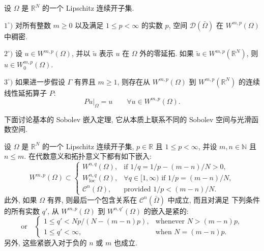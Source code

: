 
\setcounter{statement}{1}
\renewcommand{\theHstatement}{theorem.\thesection.\arabic{statement}}
\begin{Theorem}\label{thm:sobolev-density-extension}
设 $\Omega$ 是 $\mathbb R^N$ 的一个 Lipschitz 连续开子集.

$1^\circ)$ 对所有整数 $m\geq0$ 以及满足 $1\leq p<\infty$ 的实数 $p$, 空间
$\mathcal D(\bar\Omega)$ 在 $W^{m,p}(\Omega)$ 中稠密.

$2^\circ)$ 设 $u\in W^{m,p}(\Omega)$, 并以 $\tilde u$ 表示 $u$ 在 $\Omega$ 外的零延拓.
如果 $\tilde u\in W^{m,p}(\mathbb R^N)$, 则 $u\in W_0^{m,p}(\Omega)$.

$3^\circ)$ 如果进一步假设 $\Gamma$ 有界且 $m\geq1$, 则存在从 $W^{m,p}(\Omega)$ 到
$W^{m,p}(\mathbb R^N)$ 的连续线性延拓算子 $P$:
\[
  Pu|_\Omega=u\qquad\forall u\in W^{m,p}(\Omega).
\]
\end{Theorem}

下面讨论基本的 Sobolev 嵌入定理, 它从本质上联系不同的 Sobolev 空间与光滑函数空间.

\setcounter{statement}{2}
\renewcommand{\theHstatement}{theorem.\thesection.\arabic{statement}}
\begin{Theorem}\label{thm:sobolev-embedding}
设 $\Omega$ 是 $\mathbb R^N$ 的一个 Lipschitz 连续开子集, $p\in\mathbb R$ 且
$1\leq p<\infty$, 并设 $m,n\in\mathbb N$ 且 $n\leq m$. 在代数意义和拓扑意义下都有如下嵌入:
\begin{equation}\label{eq:sobolev-embedding-cases}
W^{m,p}(\Omega)\subset
\begin{cases}
W^{n,q}(\Omega),&\text{if }1/q=1/p-(m-n)/N>0,\\
W_{\mathrm{loc}}^{n,q}(\Omega),&\forall q\in[1,\infty)\text{ if }1/p=(m-n)/N,\\
\mathcal C^n(\Omega),&\text{provided }1/p<(m-n)/N.
\end{cases}
\end{equation}
此外, 如果 $\Omega$ 有界, 则最后一个包含关系在 $\mathcal C^n(\bar\Omega)$ 中成立, 而且对满足
下列条件的所有实数 $q'$, 从 $W^{m,p}(\Omega)$ 到 $W^{n,q'}(\Omega)$ 的嵌入是紧的:
\begin{equation}\label{eq:sobolev-compact-embedding-range}
\text{or}\quad
\begin{cases}
1\leq q'<Np/(N-(m-n)p),&\text{whenever }N>(m-n)p,\\
1\leq q'<\infty,&\text{when }N=(m-n)p.
\end{cases}
\end{equation}
另外, 这些紧嵌入对于负的 $n$ 或 $m$ 也成立.
\end{Theorem}

